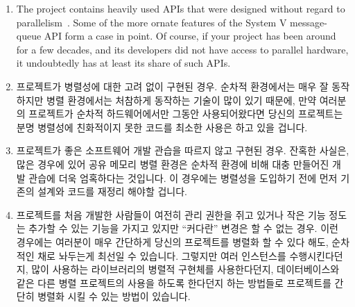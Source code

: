 {\begin{enumerate}
	\item	The project contains heavily used APIs that were designed
		without regard to
		parallelism~\cite{HagitAttiya2011LawsOfOrder,Clements:2013:SCR:2517349.2522712}.
		Some of the more ornate features of the System V
		message-queue API form a case in point.
		Of course, if your project has been around for a few
		decades, and its developers did not have access to
		parallel hardware, it undoubtedly has at least
		its share of such APIs.
	\fi

	\item	프로젝트가 병렬성에 대한 고려 없이 구현된 경우.
		순차적 환경에서는 매우 잘 동작하지만 병렬 환경에서는 처참하게
		동작하는 기술이 많이 있기 때문에, 만약 여러분의 프로젝트가
		순차적 하드웨어에서만 그동안 사용되어왔다면 당신의 프로젝트는
		분명 병렬성에 친화적이지 못한 코드를 최소한 사용은 하고 있을
		겁니다.

	\item	프로젝트가 좋은 소프트웨어 개발 관습을 따르지 않고 구현된 경우.
		잔혹한 사실은, 많은 경우에 있어 공유 메모리 병렬 환경은 순차적
		환경에 비해 대충 만들어진 개발 관습에 더욱 엄혹하다는 것입니다.
		이 경우에는 병렬성을 도입하기 전에 먼저 기존의 설계와 코드를
		재정리 해야할 겁니다.

	\item	프로젝트를 처음 개발한 사람들이 여전히 관리 권한을 쥐고
		있거나 작은 기능 정도는 추가할 수 있는 기능을 가지고 있지만
		``커다란'' 변경은 할 수 없는 경우.
		이런 경우에는 여러분이 매우 간단하게 당신의 프로젝트를 병렬화
		할 수 있다 해도, 순차적인 채로 놔두는게 최선일 수 있습니다.
		그렇지만 여러 인스턴스를 수행시킨다던지, 많이 사용하는
		라이브러리의 병렬적 구현체를 사용한다던지, 데이터베이스와 같은
		다른 병렬 프로젝트의 사용을 하도록 한다던지 하는 방법들로
		프로젝트를 간단히 병렬화 시킬 수 있는 방법이 있습니다.
	\iffalse


\end{enumerate}}

